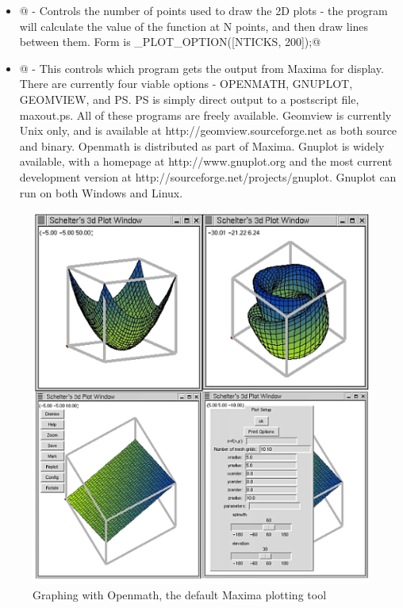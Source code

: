 \begin{itemize}
  \item \verb@[NTICKS, 100]@ - Controls the number of points used to draw the 2D plots - the program will calculate the value of the function at N points, and then draw lines between them.  Form is \verb@SET_PLOT_OPTION([NTICKS, 200]);@
  \item {}@ - This controls which program gets the output from Maxima for display.  There are currently four viable options - OPENMATH, GNUPLOT, GEOMVIEW, and PS.  PS is simply direct output to a postscript file, maxout.ps.  All of these programs are freely available.  
  Geomview is currently Unix only, and is available at
  http://geomview.sourceforge.net as both source and binary.  Openmath is
  distributed as part of Maxima.  Gnuplot is widely available, with a homepage
  at http://www.gnuplot.org and the most current development version at
  http://sourceforge.net/projects/gnuplot.  Gnuplot can run on both Windows and
  Linux. 
  \end{itemize}

\begin{figure}

\centering \includegraphics{images/maxima_openmath} \par
\caption{Graphing with Openmath, the default Maxima plotting tool}

\end{figure}

